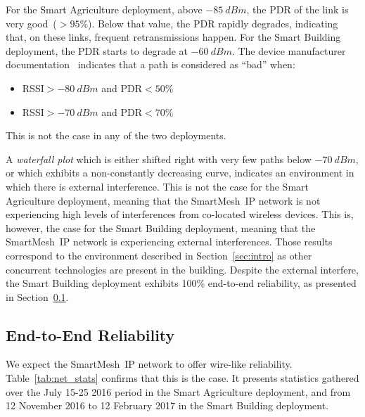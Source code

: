 \documentclass{elsarticle}
\newcommand{\smip}                {SmartMesh~IP\xspace}
\newcommand{\building}            {Smart Building\xspace}
\newcommand{\agri}                {Smart Agriculture\xspace}
\begin{document}
For the \agri deployment, above $-85~dBm$, the PDR of the link is very good~($>95$\%).
Below that value, the PDR rapidly degrades, indicating that, on these links, frequent retransmissions happen.
For the \building deployment, the PDR starts to degrade at $-60~dBm$.
The device manufacturer documentation~\cite{smip_app_note} indicates that a path is considered as ``bad'' when:

\begin{itemize}
    \item RSSI$>-80~dBm$ and PDR$<50$\%
    \item RSSI$>-70~dBm$ and PDR$<70$\%
\end{itemize}

This is not the case in any of the two deployments.


A \textit{waterfall plot} which is either shifted right with very few paths below $-70~dBm$, or which exhibits a non-constantly decreasing curve, indicates an environment in which there is external interference.
This is not the case for the \agri deployment, meaning that the \smip network is not experiencing high levels of interferences from co-located wireless devices.
This is, however, the case for the \building deployment, meaning that the \smip network is experiencing external interferences.
Those results correspond to the environment described in Section~\ref{sec:intro} as other concurrent technologies are present in the building.
Despite the external interfere, the \building deployment exhibits 100\% end-to-end reliability, as presented in Section~\ref{sec:net_reliability}.

\subsection{End-to-End Reliability}
\label{sec:net_reliability}


We expect the \smip network to offer wire-like reliability.
Table~\ref{tab:net_stats} confirms that this is the case.
It presents statistics gathered over the July 15-25 2016 period in the \agri deployment, and from 12 November 2016 to 12 February 2017 in the \building deployment.
\end{document}
